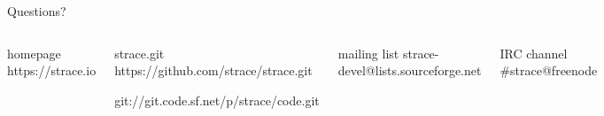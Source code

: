 \documentclass[unicode]{beamer}
\begin{document}
{
\begin{frame}{Questions?}
	\begin{columns}
		\column{7cm}
\begin{block}{\large homepage}
	https://strace.io
\end{block}
\begin{block}{\large strace.git}
	https://github.com/strace/strace.git

	git://git.code.sf.net/p/strace/code.git
\end{block}
\begin{block}{\large mailing list}
	strace-devel@lists.sourceforge.net
\end{block}
\begin{block}{\large IRC channel}
	\#strace@freenode
\end{block}
		\column{3cm}
			\centerline{\includegraphics[height=7cm]{strace-straus-1781x3426.png}}
	\end{columns}
\end{frame}
}
\end{document}
